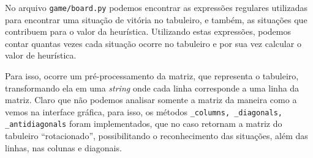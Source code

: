 \documentclass{article}
\begin{document}
No arquivo \texttt{game/board.py} podemos encontrar as expressões regulares
utilizadas para encontrar uma situação de vitória no tabuleiro, e também, as
situações que contribuem para o valor da heurística. Utilizando estas
expressões, podemos contar quantas vezes cada situação ocorre no tabuleiro e
por sua vez calcular o valor de heurística.

Para isso, ocorre um pré-processamento da matriz, que representa o tabuleiro,
transformando ela em uma \textit{string} onde cada linha corresponde a uma
linha da matriz. Claro que não podemos analisar somente a matriz da maneira
como a vemos na interface gráfica, para isso, os métodos \texttt{\_columns,
\_diagonals, \_antidiagonals} foram implementados, que no caso retornam a
matriz do tabuleiro ``rotacionado'', possibilitando o reconhecimento das
situações, além das linhas, nas colunas e diagonais.
\end{document}
